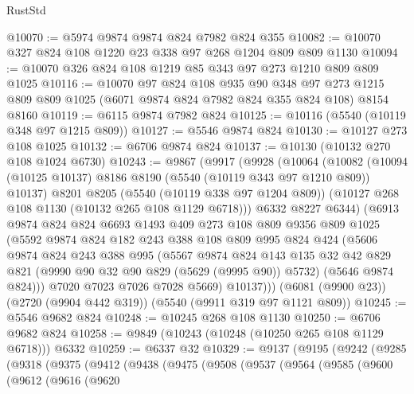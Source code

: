 \begin{lexlean}{RustStd}
\begin{coremodule}
@10070 := @5974 @9874 @9874 @824 @7982 @824 @355
@10082 := @10070 @327 @824 @108 @1220 @23 @338 @97 @268 @1204 @809 @809 @1130
@10094 := @10070 @326 @824 @108 @1219 @85 @343 @97 @273 @1210 @809 @809 @1025
@10116 := @10070
    @97
    @824
    @108
    @935
    @90
    @348
    @97
    @273
    @1215
    @809
    @809
    @1025
    (@6071 @9874 @824 @7982 @824 @355 @824 @108)
    @8154
    @8160
@10119 := @6115 @9874 @7982 @824
@10125 := @10116 (@5540 (@10119 @348 @97 @1215 @809))
@10127 := @5546 @9874 @824
@10130 := @10127 @273 @108 @1025
@10132 := @6706 @9874 @824
@10137 := @10130 (@10132 @270 @108 @1024 @6730)
@10243 := @9867
    (@9917
      (@9928
        (@10064
          (@10082
            (@10094 (@10125 @10137) @8186 @8190 (@5540 (@10119 @343 @97 @1210 @809)) @10137)
            @8201
            @8205
            (@5540 (@10119 @338 @97 @1204 @809))
            (@10127 @268 @108 @1130 (@10132 @265 @108 @1129 @6718)))
          @6332
          @8227
          @6344)
        (@6913
          @9874
          @824
          @824
          @6693
          @1493
          @409
          @273
          @108
          @809
          @9356
          @809
          @1025
          (@5592
            @9874
            @824
            @182
            @243
            @388
            @108
            @809
            @995
            @824
            @424
            (@5606
              @9874
              @824
              @243
              @388
              @995
              (@5567
                @9874
                @824
                @143
                @135
                @32
                @42
                @829
                @821
                (@9990 @90 @32 @90 @829 (@5629 (@9995 @90)) @5732)
                (@5646 @9874 @824)))
            @7020
            @7023
            @7026
            @7028
            @5669)
          @10137)))
    (@6081 (@9900 @23))
    (@2720 (@9904 @442 @319))
    (@5540 (@9911 @319 @97 @1121 @809))
@10245 := @5546 @9682 @824
@10248 := @10245 @268 @108 @1130
@10250 := @6706 @9682 @824
@10258 := @9849 (@10243 (@10248 (@10250 @265 @108 @1129 @6718))) @6332
@10259 := @6337 @32
@10329 := @9137
    (@9195
      (@9242
        (@9285
          (@9318
            (@9375
              (@9412
                (@9438
                  (@9475
                    (@9508
                      (@9537
                        (@9564
                          (@9585
                            (@9600
                              (@9612
                                (@9616
                                  (@9620

\end{coremodule}
\end{lexlean}
